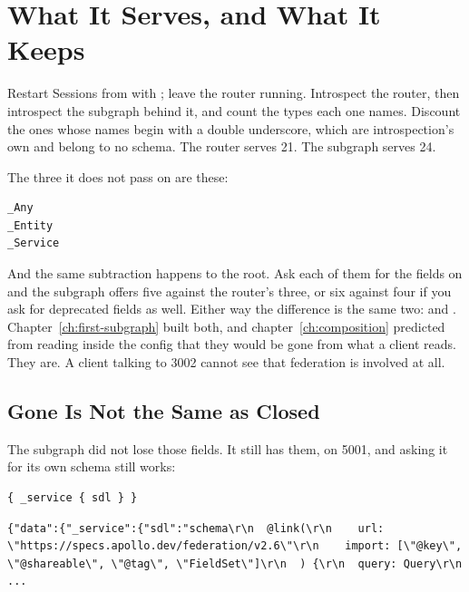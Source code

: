 \section{What It Serves, and What It Keeps}
\label{sec:ch08-what-it-serves-and-what-it-keeps}

%
Restart Sessions from  with ; leave the
router running. Introspect the router, then introspect the subgraph behind it,
and count the types each one names. Discount the ones whose names begin with a double
underscore, which are introspection's own and belong to no schema. The router
serves 21. The subgraph serves 24.

%
The three it does not pass on are these:

\begin{verbatim}
_Any
_Entity
_Service
\end{verbatim}

%
And the same subtraction happens to the root. Ask each of them for the fields
on  and the subgraph offers five against the router's three, or six
against four if you ask for deprecated fields as well. Either way the
difference is the same two:  and .
Chapter~\ref{ch:first-subgraph} built both, and
chapter~\ref{ch:composition} predicted from reading  inside
the config that they would be gone from what a client reads. They are. A client
talking to 3002 cannot see that federation is involved at all.

\subsection{Gone Is Not the Same as Closed}

%
The subgraph did not lose those fields. It still has them, on 5001, and asking
it for its own schema still works:

\begin{verbatim}
{ _service { sdl } }
\end{verbatim}

\begin{verbatim}
{"data":{"_service":{"sdl":"schema\r\n  @link(\r\n    url: \"https://specs.apollo.dev/federation/v2.6\"\r\n    import: [\"@key\", \"@shareable\", \"@tag\", \"FieldSet\"]\r\n  ) {\r\n  query: Query\r\n ...
\end{verbatim}


